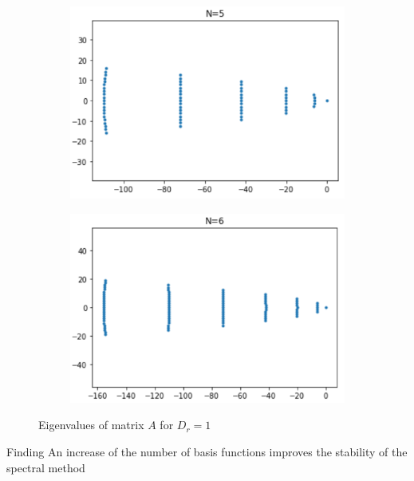 \begin{frame}
	\begin{figure}
		\begin{subfigure}{0.48\textwidth}
			\includegraphics[width=\linewidth]{Bilder_wx/Stability/Ew_10th_dr=1_dt=1}
		\end{subfigure}
		\hfill
		\begin{subfigure}{0.48\textwidth}
			\includegraphics[width=\linewidth]{Bilder_wx/Stability/Ew_12th_dr=1_dt=1}
		\end{subfigure}
		\caption{Eigenvalues of matrix $A$ for $D_r = 1$}
	\end{figure}
	\begin{block}{Finding}
		An increase of the number of basis functions improves the stability of the spectral method
	\end{block}
\end{frame}

